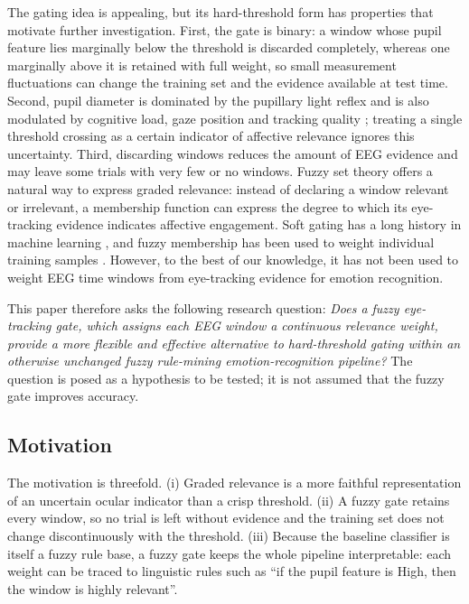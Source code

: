 \documentclass[11pt,a4paper]{article}
\begin{document}
The gating idea is appealing, but its hard-threshold form has properties that motivate further investigation. First, the gate is binary: a window whose pupil feature lies marginally below the threshold is discarded completely, whereas one marginally above it is retained with full weight, so small measurement fluctuations can change the training set and the evidence available at test time. Second, pupil diameter is dominated by the pupillary light reflex and is also modulated by cognitive load, gaze position and tracking quality \cite{Mathot2018,Raiturkar2016,Holmqvist2012}; treating a single threshold crossing as a certain indicator of affective relevance ignores this uncertainty. Third, discarding windows reduces the amount of EEG evidence and may leave some trials with very few or no windows. Fuzzy set theory \cite{Zadeh1965} offers a natural way to express graded relevance: instead of declaring a window relevant or irrelevant, a membership function can express the degree to which its eye-tracking evidence indicates affective engagement. Soft gating has a long history in machine learning \cite{Jacobs1991,Arevalo2020}, and fuzzy membership has been used to weight individual training samples \cite{LinWang2002}. However, to the best of our knowledge, it has not been used to weight EEG time windows from eye-tracking evidence for emotion recognition.

This paper therefore asks the following research question: \emph{Does a fuzzy eye-tracking gate, which assigns each EEG window a continuous relevance weight, provide a more flexible and effective alternative to hard-threshold gating within an otherwise unchanged fuzzy rule-mining emotion-recognition pipeline?} The question is posed as a hypothesis to be tested; it is not assumed that the fuzzy gate improves accuracy.

\subsection{Motivation}
The motivation is threefold. (i) Graded relevance is a more faithful representation of an uncertain ocular indicator than a crisp threshold. (ii) A fuzzy gate retains every window, so no trial is left without evidence and the training set does not change discontinuously with the threshold. (iii) Because the baseline classifier is itself a fuzzy rule base, a fuzzy gate keeps the whole pipeline interpretable: each weight can be traced to linguistic rules such as ``if the pupil feature is High, then the window is highly relevant''.
\end{document}
